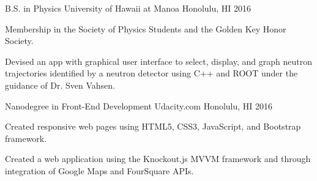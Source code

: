 \begin{cventries}
  \cventry
    {B.S. in Physics}
    {University of Hawaii at Manoa}
    {Honolulu, HI}
    {2016}
    {
      \begin{cvitems}
        \item {Membership in the Society of Physics Students and the Golden Key Honor Society.}
        \item {Devised an app with graphical user interface to select, display, and graph neutron trajectories identified by a neutron detector using C++ and
        	ROOT under the guidance of Dr. Sven Vahsen.}
      \end{cvitems}
    }
    
  \cventry
  {Nanodegree in Front-End Development}
  {Udacity.com}
  {Honolulu, HI}
  {2016}
  {
  	\begin{cvitems}
  		\item {Created responsive web pages using HTML5, CSS3, JavaScript, and Bootstrap framework.}
  		\item {Created a web application using the Knockout.js MVVM framework and through integration of Google Maps and FourSquare APIs.}
  	\end{cvitems}
  }    
\end{cventries}

